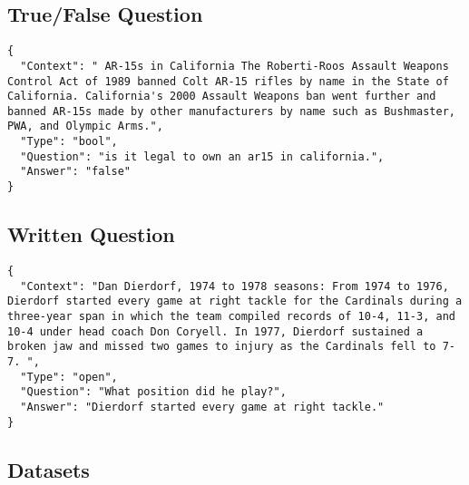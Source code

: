 \subsection*{True/False Question}

\begin{verbatim}
{
  "Context": " AR-15s in California The Roberti-Roos Assault Weapons Control Act of 1989 banned Colt AR-15 rifles by name in the State of California. California's 2000 Assault Weapons ban went further and banned AR-15s made by other manufacturers by name such as Bushmaster, PWA, and Olympic Arms.",
  "Type": "bool",
  "Question": "is it legal to own an ar15 in california.",
  "Answer": "false"
}
\end{verbatim}


\subsection*{Written Question}

\begin{verbatim}
{
  "Context": "Dan Dierdorf, 1974 to 1978 seasons: From 1974 to 1976, Dierdorf started every game at right tackle for the Cardinals during a three-year span in which the team compiled records of 10-4, 11-3, and 10-4 under head coach Don Coryell. In 1977, Dierdorf sustained a broken jaw and missed two games to injury as the Cardinals fell to 7-7. ",
  "Type": "open",
  "Question": "What position did he play?",
  "Answer": "Dierdorf started every game at right tackle."
}
\end{verbatim}

\newpage

\subsection{Datasets}

